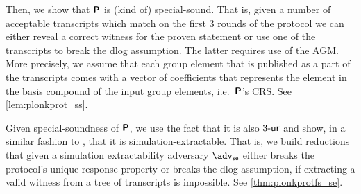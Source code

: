 \let\accentvec\vec \documentclass[runningheads,10pt]{llncs}
\begin{document}
Then, we show that 
$\bm{\mathsf{P}}$ is (kind of) special-sound. That is, given a number of acceptable
transcripts which match on the first 3 rounds of the protocol we can either
reveal a correct witness for the proven statement or use one of the transcripts
to break the dlog assumption. The latter requires use of the AGM. More
precisely, we assume that each group element that is published as a part of the
transcripts comes with a vector of coefficients that represents the element in
the basis compound of the input group elements, i.e.~$\bm{\mathsf{P}}$'s CRS. See \cref{lem:plonkprot_ss}.

Given special-soundness of $\bm{\mathsf{P}}$, we use the fact that it is also ${3\text{-}\mathsf{ur}}$ and show, in a similar fashion to \cite{INDOCRYPT:FKMV12}, that it is simulation-extractable. That is, we build reductions that given a simulation extractability adversary $\advse$ either breaks the protocol's unique response property or breaks the dlog assumption, if extracting a valid witness from a tree of transcripts is impossible. See \cref{thm:plonkprotfs_se}.
\end{document}
